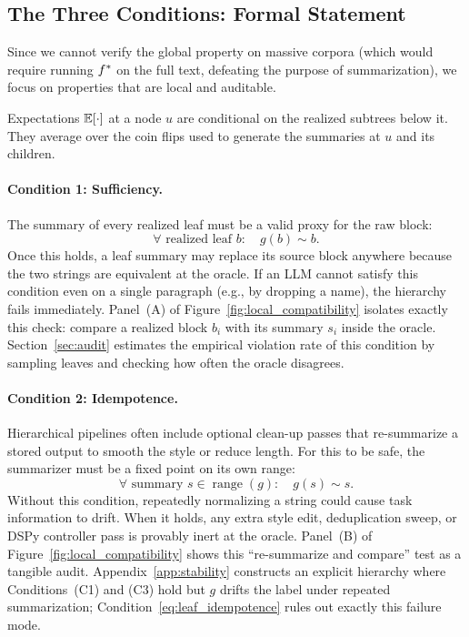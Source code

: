 \subsection{The Three Conditions: Formal Statement}

Since we cannot verify the global property on massive corpora (which would require running $f^{\ast}$ on the full text, defeating the purpose of summarization), we focus on properties that are local and auditable.

\begin{convention}
Expectations $\mathbb{E}[\cdot]$ at a node $u$ are conditional on the realized subtrees below it. They average over the coin flips used to generate the summaries at $u$ and its children.
\end{convention}

\paragraph{Condition 1: Sufficiency.}
The summary of every realized leaf must be a valid proxy for the raw block:
\begin{equation}\tag{C1}\label{eq:leaf_sufficiency}
\forall \text{ realized leaf } b:\quad g(b) \sim b.
\end{equation}
Once this holds, a leaf summary may replace its source block anywhere because the two strings are equivalent at the oracle. If an LLM cannot satisfy this condition even on a single paragraph (e.g., by dropping a name), the hierarchy fails immediately. Panel~(A) of Figure~\ref{fig:local_compatibility} isolates exactly this check: compare a realized block $b_i$ with its summary $s_i$ inside the oracle. Section~\ref{sec:audit} estimates the empirical violation rate of this condition by sampling leaves and checking how often the oracle disagrees.

\paragraph{Condition 2: Idempotence.}
Hierarchical pipelines often include optional clean-up passes that re-summarize a stored output to smooth the style or reduce length. For this to be safe, the summarizer must be a fixed point on its own range:
\begin{equation}\tag{C2}\label{eq:leaf_idempotence}
\forall \text{ summary } s \in \operatorname{range}(g):\quad g(s) \sim s.
\end{equation}
Without this condition, repeatedly normalizing a string could cause task information to drift. When it holds, any extra style edit, deduplication sweep, or DSPy controller pass is provably inert at the oracle. Panel~(B) of Figure~\ref{fig:local_compatibility} shows this ``re-summarize and compare'' test as a tangible audit. Appendix~\ref{app:stability} constructs an explicit hierarchy where Conditions~(C1) and (C3) hold but $g$ drifts the label under repeated summarization; Condition~\eqref{eq:leaf_idempotence} rules out exactly this failure mode.


